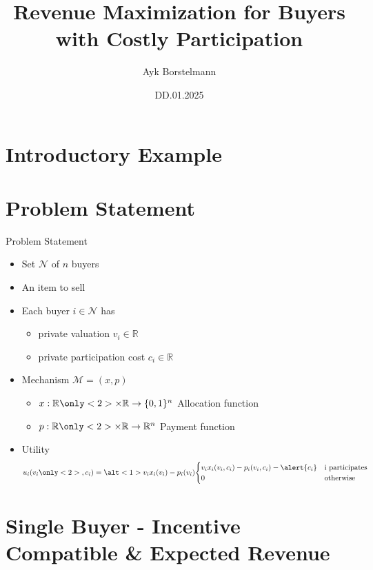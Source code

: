 \documentclass{beamer}
\title{Revenue Maximization for Buyers with Costly Participation}
\date{DD.01.2025}
\author{Ayk Borstelmann}
\institute{
    Seminar Algorithmic Game Theory
}
\begin{document}
\maketitle
\section{Introductory Example}
\section{Problem Statement}
\begin{frame}{Problem Statement}
  \begin{itemize}
    \item Set $\mathcal{N}$ of $n$ buyers
    \item An item to sell
    \item Each buyer $i \in \mathcal{N}$ has
          \begin{itemize}
            \item private valuation $v_i \in \mathbb{R}$
            \item<2-> \alert{private participation cost $c_i \in \mathbb{R}$}
          \end{itemize}
    \item Mechanism $\mathcal{M} = (x,p)$
          \begin{itemize}
            \item $x: \mathbb{R} \only<2>{\times \mathbb{R}} \rightarrow \{0,1\}^n$ Allocation function
            \item $p: \mathbb{R} \only<2>{\times \mathbb{R}} \rightarrow \mathbb{R}^n$ Payment function
          \end{itemize}
    \item Utility
          \begin{align*}
            u_i(v_i\only<2>{, c_i}) = \alt<1>{v_i x_i(v_i) - p_i(v_i)}{\begin{cases}v_i x_i(v_i, c_i) - p_i(v_i, c_i) - \alert{c_i} & \text{i participates} \\ 0 & \text{otherwise}\end{cases}}
          \end{align*}
  \end{itemize}
\end{frame}
\section{Single Buyer - Incentive Compatible \& Expected Revenue}
\end{document}
